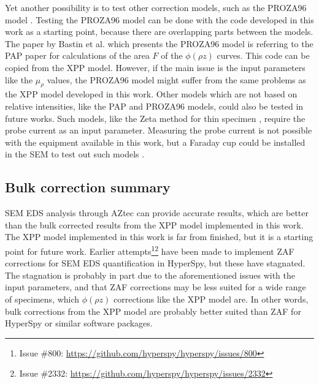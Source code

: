 Yet another possibility is to test other correction models, such as the PROZA96 model \cite{bastin_proza96_1998}.
Testing the PROZA96 model can be done with the code developed in this work as a starting point, because there are overlapping parts between the models.
The paper by Bastin et al. \cite{bastin_proza96_1998} which presents the PROZA96 model is referring to the PAP paper for calculations of the area $F$ of the $\phi(\rho z)$ curves.
This code can be copied from the XPP model.
However, if the main issue is the input parameters like the $\mu_\rho$ values, the PROZA96 model might suffer from the same problems as the XPP model developed in this work.
Other models which are not based on relative intensities, like the PAP and PROZA96 models, could also be tested in future works.
Such models, like the Zeta method for thin specimen \cite[Ch. 35.5]{williams_carter_tem_2009}, require the probe current as an input parameter.
Measuring the probe current is not possible with the equipment available in this work, but a Faraday cup could be installed in the SEM to test out such models \cite{goldstein_scanning_2018}.












\subsection{Bulk correction summary}
\label{discussion:quantitative:summary}


SEM EDS analysis through AZtec can provide accurate results, which are better than the bulk corrected results from the XPP model implemented in this work.
The XPP model implemented in this work is far from finished, but it is a starting point for future work.
Earlier attempts\footnote{Issue \#800: \url{https://github.com/hyperspy/hyperspy/issues/800}}\footnote{Issue \#2332: \url{https://github.com/hyperspy/hyperspy/issues/2332}} have been made to implement ZAF corrections for SEM EDS quantification in HyperSpy, but these have stagnated.
The stagnation is probably in part due to the aforementioned issues with the input parameters, and that ZAF corrections may be less suited for a wide range of specimens, which $\phi (\rho z)$ corrections like the XPP model are.
In other words, bulk corrections from the XPP model are probably better suited than ZAF for HyperSpy or similar software packages.


